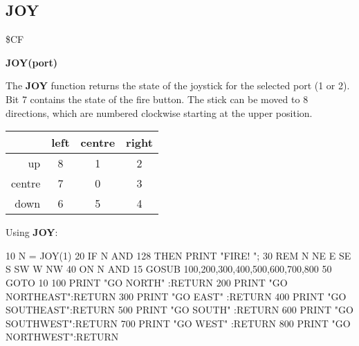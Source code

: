 \subsection{JOY}
\begin{description}[leftmargin=3cm,style=nextline]
\item [Token:] \$CF
\item [Format:] {\bf JOY(port)}
\item [Usage:] The {\bf JOY} function returns the state of the
               joystick for the selected port (1 or 2).
               Bit 7 contains the state of the fire button.
               The stick can be moved to 8 directions, which
               are numbered clockwise starting at the upper position.

\ttfamily
{\setlength{\tabcolsep}{1mm}
\begin{tabular}{|r|c|c|c|}
\hline
&  left  & centre & right \\
\hline
up     &  8 &    1  & 2 \\
centre &  7 &    0  & 3 \\
down   &  6 &    5  & 4 \\
\hline
\end{tabular}
}

\item [Example:] Using {\bf JOY}:
\begin{screenoutput}
 10 N = JOY(1)
 20 IF N AND 128 THEN PRINT "FIRE! ";
 30 REM                N   NE  E   SE  S   SW  W   NW
 40 ON N AND 15 GOSUB 100,200,300,400,500,600,700,800
 50 GOTO 10
100 PRINT "GO NORTH"    :RETURN
200 PRINT "GO NORTHEAST":RETURN
300 PRINT "GO EAST"     :RETURN
400 PRINT "GO SOUTHEAST":RETURN
500 PRINT "GO SOUTH"    :RETURN
600 PRINT "GO SOUTHWEST":RETURN
700 PRINT "GO WEST"     :RETURN
800 PRINT "GO NORTHWEST":RETURN
\end{screenoutput}
\end{description}


\newpage
